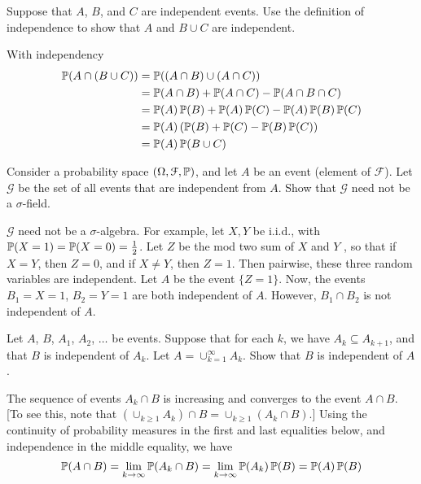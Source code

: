 \documentclass[a4paper, 12pt, answers]{exam}
\newcommand{\FF}{\mathcal{F}}
\newcommand{\rai}{\rightarrow \infty}
\begin{document}
\begin{questions}
\question Suppose that $A$, $B$, and $C$ are independent events. Use the definition of independence to show that $A$ and $B \cup C$ are independent.
\begin{solution}
	With independency
	\begin{equation*}
	\begin{aligned}
	\operatorname{\mathbb{P}}(A\cap(B\cup C))&=\operatorname{\mathbb{P}}((A\cap B)\cup(A\cap C))\\
	&=\operatorname{\mathbb{P}}(A\cap B)+\operatorname{\mathbb{P}}(A\cap C)-\operatorname{\mathbb{P}}(A\cap B\cap C)\\
	&=\operatorname{\mathbb{P}}(A)\operatorname{\mathbb{P}}(B)+\operatorname{\mathbb{P}}(A)\operatorname{\mathbb{P}}(C)-\operatorname{\mathbb{P}}(A)\operatorname{\mathbb{P}}(B)\operatorname{\mathbb{P}}(C)\\
	&=\operatorname{\mathbb{P}}(A)\left(\operatorname{\mathbb{P}}(B)+\operatorname{\mathbb{P}}(C)-\operatorname{\mathbb{P}}(B)\operatorname{\mathbb{P}}(C)\right)\\
	&=\operatorname{\mathbb{P}}(A)\operatorname{\mathbb{P}}(B\cup C)
	\end{aligned}
	\end{equation*}
\end{solution}


\question Consider a probability space $(\Omega, \FF, \Prob)$, and let $A$ be an event (element of $\FF$). Let $\mathcal{G}$ be the set of all events that are independent from $A$. Show that $\mathcal{G}$ need not be a $\sigma$-field.
\begin{solution}
	$\mathcal{G}$ need not be a $\sigma$-algebra. For example, let $X, Y$ be i.i.d., with $\operatorname{\mathbb{P}}(X=1)=\operatorname{\mathbb{P}}(X=0)=\frac 12$. Let $Z$ be the mod two sum of $X$ and $Y$ , so that if $X=Y$, then $Z=0$, and if $X\ne Y$, then $Z=1$. Then pairwise, these three random variables are independent. Let $A$ be the event $\{Z=1\}$. Now, the events $B_1={X =1}$, $B_2={Y=1}$ are both independent of $A$. However, $B_1 \cap B_2$ is not independent of $A$.
\end{solution}
\question Let $A$, $B$, $A_1$, $A_2$, $\dots$ be events. Suppose that for each $k$, we have $A_k \subseteq A_{k+1}$, and that $B$ is independent of $A_k$. Let $A = \cup_{k=1}^{\infty}A_k$. Show that $B$ is independent of $A$.
\begin{solution}
	The sequence of events $A_k \cap B$ is increasing and converges to the event $A \cap B$. [To see this, note that $(\cup_{k\ge1}A_k)\cap B =\cup_{k\ge 1} (A_k \cap B)$.] Using the continuity of probability measures in the first and last equalities below, and independence in the middle equality, we have
	\begin{equation*}
	\Prob(A \cap B)= \lim\limits_{k\rai} \Prob(A_k \cap B)= \lim\limits_{k\rai} \Prob(A_k)\Prob(B)=\Prob(A)\Prob(B)
	\end{equation*}
	\end{solution}
\end{questions}  
\end{document}
